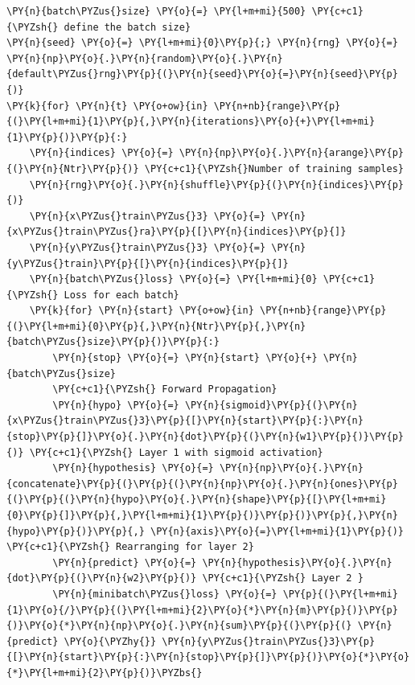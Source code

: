 \documentclass[a4paper,11pt]{article}%
\begin{document}
    \begin{tcolorbox}[breakable, size=fbox, boxrule=1pt, pad at break*=1mm,colback=cellbackground, colframe=cellborder]
\begin{Verbatim}[commandchars=\\\{\}]
\PY{n}{batch\PYZus{}size} \PY{o}{=} \PY{l+m+mi}{500} \PY{c+c1}{\PYZsh{} define the batch size}
\PY{n}{seed} \PY{o}{=} \PY{l+m+mi}{0}\PY{p}{;} \PY{n}{rng} \PY{o}{=} \PY{n}{np}\PY{o}{.}\PY{n}{random}\PY{o}{.}\PY{n}{default\PYZus{}rng}\PY{p}{(}\PY{n}{seed}\PY{o}{=}\PY{n}{seed}\PY{p}{)}
\PY{k}{for} \PY{n}{t} \PY{o+ow}{in} \PY{n+nb}{range}\PY{p}{(}\PY{l+m+mi}{1}\PY{p}{,}\PY{n}{iterations}\PY{o}{+}\PY{l+m+mi}{1}\PY{p}{)}\PY{p}{:}
    \PY{n}{indices} \PY{o}{=} \PY{n}{np}\PY{o}{.}\PY{n}{arange}\PY{p}{(}\PY{n}{Ntr}\PY{p}{)} \PY{c+c1}{\PYZsh{}Number of training samples}
    \PY{n}{rng}\PY{o}{.}\PY{n}{shuffle}\PY{p}{(}\PY{n}{indices}\PY{p}{)}
    \PY{n}{x\PYZus{}train\PYZus{}3} \PY{o}{=} \PY{n}{x\PYZus{}train\PYZus{}ra}\PY{p}{[}\PY{n}{indices}\PY{p}{]}
    \PY{n}{y\PYZus{}train\PYZus{}3} \PY{o}{=} \PY{n}{y\PYZus{}train}\PY{p}{[}\PY{n}{indices}\PY{p}{]}
    \PY{n}{batch\PYZus{}loss} \PY{o}{=} \PY{l+m+mi}{0} \PY{c+c1}{\PYZsh{} Loss for each batch}
    \PY{k}{for} \PY{n}{start} \PY{o+ow}{in} \PY{n+nb}{range}\PY{p}{(}\PY{l+m+mi}{0}\PY{p}{,}\PY{n}{Ntr}\PY{p}{,}\PY{n}{batch\PYZus{}size}\PY{p}{)}\PY{p}{:}
        \PY{n}{stop} \PY{o}{=} \PY{n}{start} \PY{o}{+} \PY{n}{batch\PYZus{}size}
        \PY{c+c1}{\PYZsh{} Forward Propagation}
        \PY{n}{hypo} \PY{o}{=} \PY{n}{sigmoid}\PY{p}{(}\PY{n}{x\PYZus{}train\PYZus{}3}\PY{p}{[}\PY{n}{start}\PY{p}{:}\PY{n}{stop}\PY{p}{]}\PY{o}{.}\PY{n}{dot}\PY{p}{(}\PY{n}{w1}\PY{p}{)}\PY{p}{)} \PY{c+c1}{\PYZsh{} Layer 1 with sigmoid activation}
        \PY{n}{hypothesis} \PY{o}{=} \PY{n}{np}\PY{o}{.}\PY{n}{concatenate}\PY{p}{(}\PY{p}{(}\PY{n}{np}\PY{o}{.}\PY{n}{ones}\PY{p}{(}\PY{p}{(}\PY{n}{hypo}\PY{o}{.}\PY{n}{shape}\PY{p}{[}\PY{l+m+mi}{0}\PY{p}{]}\PY{p}{,}\PY{l+m+mi}{1}\PY{p}{)}\PY{p}{)}\PY{p}{,}\PY{n}{hypo}\PY{p}{)}\PY{p}{,} \PY{n}{axis}\PY{o}{=}\PY{l+m+mi}{1}\PY{p}{)} \PY{c+c1}{\PYZsh{} Rearranging for layer 2}
        \PY{n}{predict} \PY{o}{=} \PY{n}{hypothesis}\PY{o}{.}\PY{n}{dot}\PY{p}{(}\PY{n}{w2}\PY{p}{)} \PY{c+c1}{\PYZsh{} Layer 2 }
        \PY{n}{minibatch\PYZus{}loss} \PY{o}{=} \PY{p}{(}\PY{l+m+mi}{1}\PY{o}{/}\PY{p}{(}\PY{l+m+mi}{2}\PY{o}{*}\PY{n}{m}\PY{p}{)}\PY{p}{)}\PY{o}{*}\PY{n}{np}\PY{o}{.}\PY{n}{sum}\PY{p}{(}\PY{p}{(} \PY{n}{predict} \PY{o}{\PYZhy{}} \PY{n}{y\PYZus{}train\PYZus{}3}\PY{p}{[}\PY{n}{start}\PY{p}{:}\PY{n}{stop}\PY{p}{]}\PY{p}{)}\PY{o}{*}\PY{o}{*}\PY{l+m+mi}{2}\PY{p}{)}\PYZbs{}

\end{Verbatim}
\end{tcolorbox}
\end{document}
